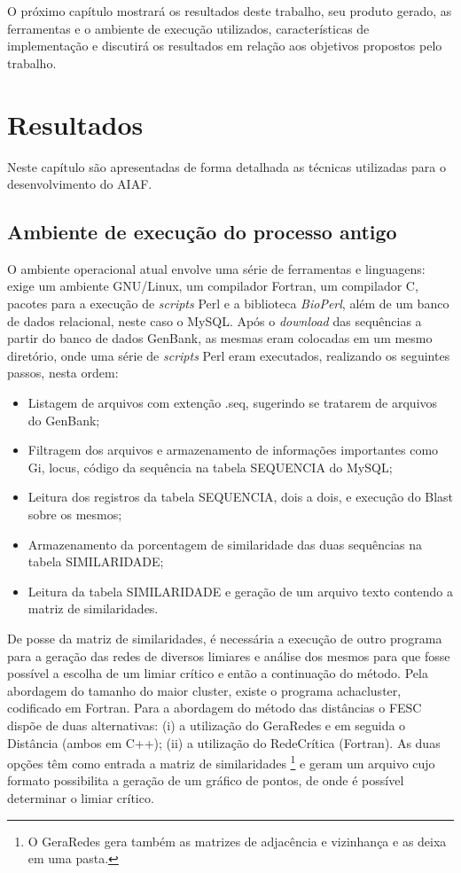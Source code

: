 O próximo capítulo mostrará os resultados deste trabalho, seu produto gerado, as ferramentas e o ambiente de execução utilizados, características
de implementação e discutirá os resultados em relação aos objetivos propostos pelo trabalho.

\chapter{Resultados}
\label{cap:resultados}

Neste capítulo são apresentadas de forma detalhada as técnicas utilizadas para o desenvolvimento do AIAF.


\section{Ambiente de execução do processo antigo} \label{sec:ambiente}

O ambiente operacional atual envolve uma série de ferramentas e linguagens: exige um ambiente GNU/Linux, um compilador Fortran, um compilador C, pacotes para
a execução de \textit{scripts} Perl e a biblioteca \textit{BioPerl}, além de um banco de dados relacional, neste caso o MySQL. Após o \textit{download} das
sequências a partir do banco de dados GenBank, as mesmas eram colocadas em um mesmo diretório, onde uma série de \textit{scripts} Perl eram executados,
realizando os seguintes passos, nesta ordem:

\begin{itemize}
  \item{Listagem de arquivos com extenção .seq, sugerindo se tratarem de arquivos do GenBank;}
  \item{Filtragem dos arquivos e armazenamento de informações importantes como Gi, locus, código da sequência na tabela SEQUENCIA do MySQL;}
  \item{Leitura dos registros da tabela SEQUENCIA, dois a dois, e execução do Blast sobre os mesmos;}
  \item{Armazenamento da porcentagem de similaridade das duas sequências na tabela SIMILARIDADE;}
  \item{Leitura da tabela SIMILARIDADE e geração de um arquivo texto contendo a matriz de similaridades.}
\end{itemize}

De posse da matriz de similaridades, é necessária a execução de outro programa para a geração das redes de diversos limiares e análise dos mesmos para que
fosse possível a escolha de um limiar crítico e então a continuação do método. Pela abordagem do tamanho do maior cluster, existe o programa achacluster,
codificado em Fortran. Para a abordagem do método das distâncias o FESC dispõe de duas alternativas: (i) a utilização do GeraRedes e em seguida o
Distância (ambos em C++); (ii) a utilização do RedeCrítica (Fortran). As duas opções têm como entrada a matriz de similaridades \footnote{O GeraRedes 
gera também as matrizes de adjacência e vizinhança e as deixa em uma pasta.} e geram um arquivo cujo formato possibilita a geração de um gráfico de pontos,
de onde é possível determinar o limiar crítico.

